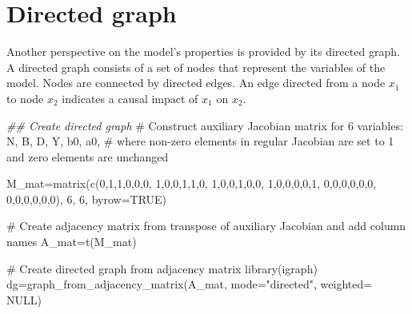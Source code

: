 \documentclass[
  letterpaper,
  DIV=11,
  numbers=noendperiod]{scrreprt}
\newenvironment{Shaded}{\begin{snugshade}}{\end{snugshade}}
\newcommand{\AttributeTok}[1]{\textcolor[rgb]{0.40,0.45,0.13}{#1}}
\newcommand{\CommentTok}[1]{\textcolor[rgb]{0.37,0.37,0.37}{#1}}
\newcommand{\ConstantTok}[1]{\textcolor[rgb]{0.56,0.35,0.01}{#1}}
\newcommand{\DecValTok}[1]{\textcolor[rgb]{0.68,0.00,0.00}{#1}}
\newcommand{\DocumentationTok}[1]{\textcolor[rgb]{0.37,0.37,0.37}{\textit{#1}}}
\newcommand{\FunctionTok}[1]{\textcolor[rgb]{0.28,0.35,0.67}{#1}}
\newcommand{\NormalTok}[1]{\textcolor[rgb]{0.00,0.23,0.31}{#1}}
\newcommand{\OtherTok}[1]{\textcolor[rgb]{0.00,0.23,0.31}{#1}}
\newcommand{\StringTok}[1]{\textcolor[rgb]{0.13,0.47,0.30}{#1}}
\begin{document}
\section{Directed graph}\label{directed-graph-9}

Another perspective on the model's properties is provided by its
directed graph. A directed graph consists of a set of nodes that
represent the variables of the model. Nodes are connected by directed
edges. An edge directed from a node \(x_1\) to node \(x_2\) indicates a
causal impact of \(x_1\) on \(x_2\).

\begin{Shaded}
\begin{Highlighting}[]
\DocumentationTok{\#\# Create directed graph}
\CommentTok{\# Construct auxiliary Jacobian matrix for 6 variables: N, B, D, Y, b0, a0,}
\CommentTok{\# where non{-}zero elements in regular Jacobian are set to 1 and zero elements are unchanged}

\NormalTok{M\_mat}\OtherTok{=}\FunctionTok{matrix}\NormalTok{(}\FunctionTok{c}\NormalTok{(}\DecValTok{0}\NormalTok{,}\DecValTok{1}\NormalTok{,}\DecValTok{1}\NormalTok{,}\DecValTok{0}\NormalTok{,}\DecValTok{0}\NormalTok{,}\DecValTok{0}\NormalTok{,}
              \DecValTok{1}\NormalTok{,}\DecValTok{0}\NormalTok{,}\DecValTok{0}\NormalTok{,}\DecValTok{1}\NormalTok{,}\DecValTok{1}\NormalTok{,}\DecValTok{0}\NormalTok{,}
              \DecValTok{1}\NormalTok{,}\DecValTok{0}\NormalTok{,}\DecValTok{0}\NormalTok{,}\DecValTok{1}\NormalTok{,}\DecValTok{0}\NormalTok{,}\DecValTok{0}\NormalTok{,}
              \DecValTok{1}\NormalTok{,}\DecValTok{0}\NormalTok{,}\DecValTok{0}\NormalTok{,}\DecValTok{0}\NormalTok{,}\DecValTok{0}\NormalTok{,}\DecValTok{1}\NormalTok{,}
              \DecValTok{0}\NormalTok{,}\DecValTok{0}\NormalTok{,}\DecValTok{0}\NormalTok{,}\DecValTok{0}\NormalTok{,}\DecValTok{0}\NormalTok{,}\DecValTok{0}\NormalTok{,}
              \DecValTok{0}\NormalTok{,}\DecValTok{0}\NormalTok{,}\DecValTok{0}\NormalTok{,}\DecValTok{0}\NormalTok{,}\DecValTok{0}\NormalTok{,}\DecValTok{0}\NormalTok{), }\DecValTok{6}\NormalTok{, }\DecValTok{6}\NormalTok{, }\AttributeTok{byrow=}\ConstantTok{TRUE}\NormalTok{)}

\CommentTok{\# Create adjacency matrix from transpose of auxiliary Jacobian and add column names}
\NormalTok{A\_mat}\OtherTok{=}\FunctionTok{t}\NormalTok{(M\_mat)}

\CommentTok{\# Create directed graph from adjacency matrix}
\FunctionTok{library}\NormalTok{(igraph)}
\NormalTok{dg}\OtherTok{=}\FunctionTok{graph\_from\_adjacency\_matrix}\NormalTok{(A\_mat, }\AttributeTok{mode=}\StringTok{"directed"}\NormalTok{, }\AttributeTok{weighted=} \ConstantTok{NULL}\NormalTok{)}


\end{Highlighting}
\end{Shaded}
\end{document}
